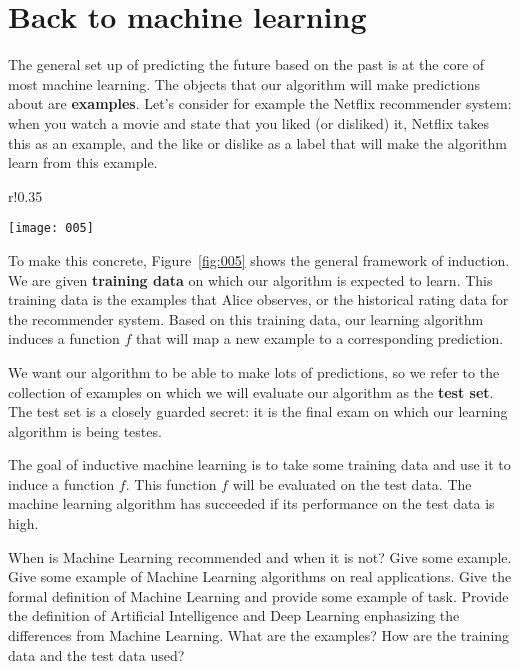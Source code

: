 \section{Back to machine learning}

The general set up of predicting the future based on the past is at the core of most machine learning. The objects that our algorithm will make predictions about are \textbf{examples}. Let's consider for example the Netflix recommender system: when you watch a movie and state that you liked (or disliked) it, Netflix takes this as an example, and the like or dislike as a label that will make the algorithm learn from this example. 

\begin{wrapfigure}{r!}{0.35\textwidth}
  \begin{center}
    \texttt{[image: 005]}
  \end{center}
  \caption{}
  \label{fig:005}
\end{wrapfigure}

To make this concrete, Figure~\ref{fig:005} shows the general framework of induction. We are given \textbf{training data} on which our algorithm is expected to learn. This training data is the examples that Alice observes, or the historical rating data for the recommender system. 
Based on this training data, our learning algorithm induces a function \(f\) that will map a new example to a corresponding prediction.

We want our algorithm to be able to make lots of predictions, so we refer to the collection of examples on which we will evaluate our algorithm as the \textbf{test set}. The test set is a closely guarded secret: it is the final exam on which our learning algorithm is being testes. 

The goal of inductive machine learning is to take some training data and use it to induce a function \(f\). This function \(f\) will be evaluated on the test data. The machine learning algorithm has succeeded if its performance on the test data is high.

\newpage
\begin{exercise}[topsep=20pt,itemsep=10pt]
  \ex When is Machine Learning recommended and when it is not? Give some example.
  \ex Give some example of Machine Learning algorithms on real applications.
  \ex Give the formal definition of Machine Learning and provide some example of task.
  \ex Provide the definition of Artificial Intelligence and Deep Learning enphasizing the differences from Machine Learning.
  \ex What are the examples?
  \ex How are the training data and the test data used?
\end{exercise}